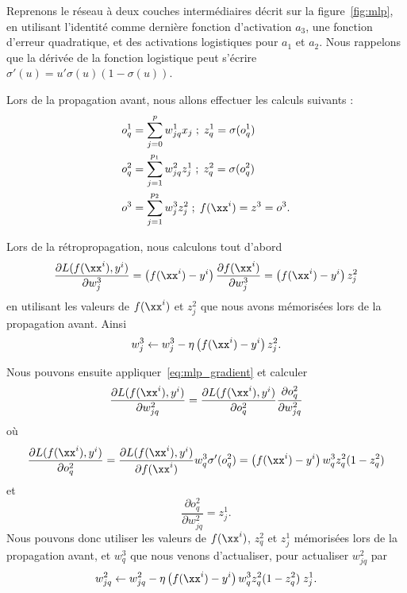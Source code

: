 \begin{exemple}
  Reprenons le réseau à deux couches intermédiaires décrit sur la
  figure~\ref{fig:mlp}, en utilisant l'identité comme dernière fonction
  d'activation $a_3$, une fonction d'erreur quadratique, et des activations
  logistiques pour $a_1$ et $a_2$. Nous rappelons que la dérivée de la
  fonction logistique peut s'écrire $\sigma'(u) = u' \sigma(u) (1 -
  \sigma(u))$.
  
  Lors de la propagation avant, nous allons effectuer les calculs suivants :
  \begin{align*}
    o^1_q & = \sum_{j=0}^p w_{jq}^1 x_j \; ; \; z^1_q = \sigma(o^1_q) \\
    o^2_q & = \sum_{j=1}^{p_1} w_{jq}^2 z^1_j \; ; \; z^2_q = \sigma(o^2_q) \\
    o^3 & = \sum_{j=1}^{p_2} w^3_j z^2_j \; ; \; f(\xx^i) = z^3 = o^3.
  \end{align*}
  
  Lors de la rétropropagation, nous calculons tout d'abord 
  \begin{equation*}
    \frac{\partial L(f(\xx^i), y^i)}{\partial w^3_j} =      
    \left(f(\xx^i) - y^i \right) \frac{\partial f(\xx^i)}{\partial w^3_j} =
    \left(f(\xx^i) - y^i \right) z^2_j
  \end{equation*}
  en utilisant les valeurs de $f(\xx^i)$ et $z^2_j$ que nous avons mémorisées
  lors de la propagation avant. Ainsi
  \begin{equation*}
    w^3_j \leftarrow w^3_j - \eta \left(f(\xx^i) - y^i \right) z^2_j.
  \end{equation*}
  
  Nous pouvons ensuite appliquer~\ref{eq:mlp_gradient} et calculer 
  \begin{equation*}
    \frac{\partial L(f(\xx^i), y^i)}{\partial w^2_{jq}}  =      
    \frac{\partial L(f(\xx^i), y^i)}{\partial o^2_q} 
    \frac{\partial o^2_q}{\partial w^2_{jq}} 
  \end{equation*}
  où 
  \begin{equation}
    \label{eq:backprop_layer2}
    \frac{\partial L(f(\xx^i), y^i)}{\partial o^2_q} =      
    \frac{\partial L(f(\xx^i), y^i)}{\partial f(\xx^i)} w^3_q \sigma'(o^2_q) = 
    \left(f(\xx^i) - y^i \right) w^3_q z^2_q (1-z^2_q)
  \end{equation}
  et 
  \begin{equation*}
    \frac{\partial o^2_q}{\partial w^2_{jq}} = z^1_j.
  \end{equation*}
  Nous pouvons donc utiliser les valeurs de $f(\xx^i)$, $z^2_q$ et $z^1_j$
  mémorisées lors de la propagation avant, et $w^3_q$ que nous venons
  d'actualiser, pour actualiser $w^2_{jq}$ par
  \begin{equation*}
    w^2_{jq} \leftarrow w^2_{jq} - \eta \left(f(\xx^i) - y^i \right) 
    w^3_q z^2_q (1-z^2_q) \; z^1_j.
  \end{equation*}
  

\end{exemple}
